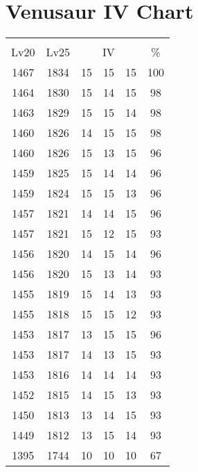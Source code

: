 \documentclass{article}%
\begin{document}
%
\normalsize%
\section{Venusaur IV Chart}%
\label{sec:Venusaur IV Chart}%
\renewcommand{\arraystretch}{1.5}%
\begin{tabular}{|c|c|c|c|c|c|}%
\hline%
\multicolumn{6}{|c|}{\textcolor{white}{ 
\linebreak{Venusaur}
}%
\cellcolor{black}}\\%
\multicolumn{1}{|c}{Lv20}&\multicolumn{1}{c|}{Lv25}&\multicolumn{3}{c|}{IV}&\multicolumn{1}{|c|}{\%}\\%
\hline%
\rowcolor{color100}%
1467&1834&15&15&15&100\\%
\hline%
\rowcolor{color98}%
1464&1830&15&14&15&98\\%
\hline%
\rowcolor{color98}%
1463&1829&15&15&14&98\\%
\hline%
\rowcolor{color98}%
1460&1826&14&15&15&98\\%
\hline%
\rowcolor{color96}%
1460&1826&15&13&15&96\\%
\hline%
\rowcolor{color96}%
1459&1825&15&14&14&96\\%
\hline%
\rowcolor{color96}%
1459&1824&15&15&13&96\\%
\hline%
\rowcolor{color96}%
1457&1821&14&14&15&96\\%
\hline%
\rowcolor{color93}%
1457&1821&15&12&15&93\\%
\hline%
\rowcolor{color96}%
1456&1820&14&15&14&96\\%
\hline%
\rowcolor{color93}%
1456&1820&15&13&14&93\\%
\hline%
\rowcolor{color93}%
1455&1819&15&14&13&93\\%
\hline%
\rowcolor{color93}%
1455&1818&15&15&12&93\\%
\hline%
\rowcolor{color96}%
1453&1817&13&15&15&96\\%
\hline%
\rowcolor{color93}%
1453&1817&14&13&15&93\\%
\hline%
\rowcolor{color93}%
1453&1816&14&14&14&93\\%
\hline%
\rowcolor{color93}%
1452&1815&14&15&13&93\\%
\hline%
\rowcolor{color93}%
1450&1813&13&14&15&93\\%
\hline%
\rowcolor{color93}%
1449&1812&13&15&14&93\\%
\hline%
\rowcolor{color91}%
1395&1744&10&10&10&67\\%
\end{tabular}

%
\end{document}
